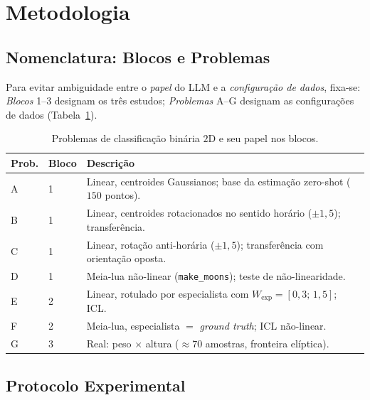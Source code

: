 \documentclass[12pt,a4paper]{article}
\begin{document}
\section{Metodologia}
\label{sec:metodologia}

\subsection{Nomenclatura: Blocos e Problemas}

Para evitar ambiguidade entre o \emph{papel} do LLM e a \emph{configuração de dados},
fixa-se: \emph{Blocos} 1–3 designam os três estudos; \emph{Problemas} A–G designam as
configurações de dados (Tabela~\ref{tab:problemas}).

\begin{table}[ht]
\centering
\caption{Problemas de classificação binária $2$D e seu papel nos blocos.}
\label{tab:problemas}
\small
\begin{tabular}{llp{7.8cm}}
\toprule
\textbf{Prob.} & \textbf{Bloco} & \textbf{Descrição} \\
\midrule
A & 1 & Linear, centroides Gaussianos; base da estimação zero-shot ($150$ pontos). \\
B & 1 & Linear, centroides rotacionados no sentido horário ($\pm 1{,}5$); transferência. \\
C & 1 & Linear, rotação anti-horária ($\pm 1{,}5$); transferência com orientação oposta. \\
D & 1 & Meia-lua não-linear (\texttt{make\_moons}); teste de não-linearidade. \\
E & 2 & Linear, rotulado por especialista com $W_{\text{exp}}=[0{,}3;\,1{,}5]$; ICL. \\
F & 2 & Meia-lua, especialista $=$ \emph{ground truth}; ICL não-linear. \\
G & 3 & Real: peso $\times$ altura ($\approx 70$ amostras, fronteira elíptica). \\
\bottomrule
\end{tabular}
\end{table}

\subsection{Protocolo Experimental}
\end{document}
